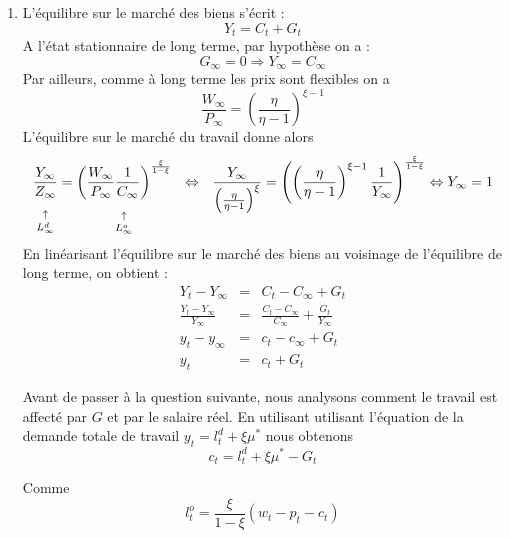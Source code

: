 \documentclass[a4paper,11pt]{article}
\begin{document}
\begin{enumerate}
\item L'\'{e}quilibre sur le march\'{e} des biens s'\'{e}crit :%
\begin{equation*}
Y_{t}=C_{t}+G_{t}
\end{equation*}%
A l'\'{e}tat stationnaire de long terme, par hypoth\`{e}se on a :%
\begin{equation*}
G_{\infty }=0\Rightarrow Y_{\infty }=C_{\infty }
\end{equation*}%
Par ailleurs, comme \`{a} long terme les prix sont flexibles on a%
\begin{equation*}
\frac{W_{\infty }}{P_{\infty }}=\left( \frac{\eta }{\eta -1}\right) ^{\xi -1}
\end{equation*}%
L'\'{e}quilibre sur le march\'{e} du travail donne alors 
\begin{equation*}
\underset{L_{\infty }^{d}}{\underset{\uparrow }{\underset{}{\frac{Y_{\infty }%
}{Z_{\infty }}}}}=\underset{L_{\infty }^{o}}{\underset{\uparrow }{\underset{}%
{\left( \frac{W_{\infty }}{P_{\infty }}\frac{1}{C_{\infty }}\right) ^{\frac{%
\xi }{1-\xi }}}}}\ \ \Leftrightarrow \ \ \frac{Y_{\infty }}{\left( \frac{%
\eta }{\eta -1}\right) ^{\xi }}=\left( \left( \frac{\eta }{\eta -1}\right)
^{\xi -1}\frac{1}{Y_{\infty }}\right) ^{\frac{\xi }{1-\xi }}\Leftrightarrow
Y_{\infty }=1
\end{equation*}%
En lin\'{e}arisant l'\'{e}quilibre sur le march\'{e} des biens au voisinage
de l'\'{e}quilibre de long terme, on obtient :%
\begin{eqnarray*}
Y_{t}-Y_{\infty } &=&C_{t}-C_{\infty }+G_{t} \\
\frac{Y_{t}-Y_{\infty }}{Y_{\infty }} &=&\frac{C_{t}-C_{\infty }}{C_{\infty }%
}+\frac{G_{t}}{Y_{\infty }} \\
y_{t}-y_{\infty } &=&c_{t}-c_{\infty }+G_{t} \\
y_{t} &=&c_{t}+G_{t}
\end{eqnarray*}

Avant de passer à la question suivante, nous analysons comment le travail est affecté par $G$ et par le salaire réel. En utilisant 
utilisant l'équation de la demande totale de travail $y_{t}= l_t^d + \xi \mu ^{\ast }$ nous obtenons
\begin{equation*}
c_{t}= l_t^d + \xi \mu ^{\ast }-G_t
\end{equation*}

Comme \begin{equation*}
l_{t}^{o}=\frac{\xi}{1-\xi}(w_{t}-p_{t}-c_{t}) 
\end{equation*}


\end{enumerate}
\end{document}
